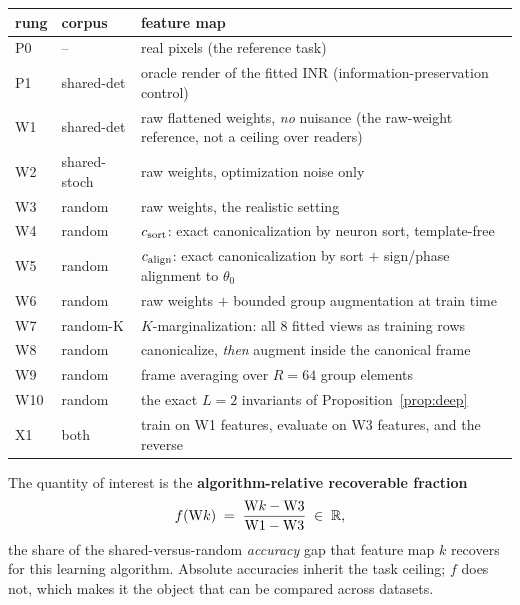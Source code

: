 \begin{center}\small
\footnotesize\begin{tabular}{@{}llp{4.6cm}@{}}
\toprule
rung & corpus & feature map \\
\midrule
P0 & -- & real pixels (the reference task) \\
P1 & shared-det & oracle render of the fitted INR (information-preservation control) \\
W1 & shared-det & raw flattened weights, \emph{no} nuisance (the raw-weight reference, not a ceiling over readers) \\
W2 & shared-stoch & raw weights, optimization noise only \\
W3 & random & raw weights, the realistic setting \\
W4 & random & $c_{\mathrm{sort}}$: exact canonicalization by neuron sort, template-free \\
W5 & random & $c_{\mathrm{align}}$: exact canonicalization by sort $+$ sign/phase alignment to $\theta_0$ \\
W6 & random & raw weights $+$ bounded group augmentation at train time \\
W7 & random-K & $K$-marginalization: all 8 fitted views as training rows \\
W8 & random & canonicalize, \emph{then} augment inside the canonical frame \\
W9 & random & frame averaging over $R=64$ group elements \\
W10 & random & the exact $L{=}2$ invariants of Proposition~\ref{prop:deep} \\
X1 & both & train on W1 features, evaluate on W3 features, and the reverse \\
\bottomrule
\end{tabular}
\end{center}

The quantity of interest is the \textbf{algorithm-relative recoverable fraction}
\begin{equation}
f(\mathrm{W}k) \;=\; \frac{\mathrm{W}k - \mathrm{W3}}{\mathrm{W1} - \mathrm{W3}} \;\in\; \mathbb{R},
\label{eq:f}
\end{equation}
the share of the shared-versus-random \emph{accuracy} gap that feature map $k$ recovers for this
learning algorithm. Absolute accuracies inherit the task ceiling; $f$ does not, which makes it the
object that can be compared across datasets.

